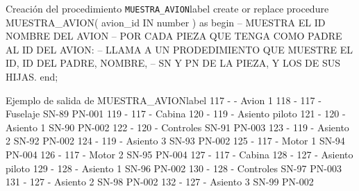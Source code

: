 \begin{homeworkProblem}
\begin{listadosql}{Creación del procedimiento \texttt{MUESTRA\_AVION}}{label}
create or replace procedure MUESTRA_AVION( avion_id IN number ) 
as
begin
  -- MUESTRA EL ID NOMBRE DEL AVION
  -- POR CADA PIEZA QUE TENGA COMO PADRE AL ID DEL AVION:
  --   LLAMA A UN PRODEDIMIENTO QUE MUESTRE EL ID, ID DEL PADRE, NOMBRE, 
  --   SN Y PN DE LA PIEZA, Y LOS DE SUS HIJAS.
end;
\end{listadosql}


\begin{listadotxt}{Ejemplo de salida de MUESTRA\_AVION}{label}
117 -  - Avion 1  
    118 - 117 - Fuselaje SN-89 PN-001
    119 - 117 - Cabina  
        120 - 119 - Asiento piloto  
            121 - 120 - Asiento 1 SN-90 PN-002
            122 - 120 - Controles SN-91 PN-003
        123 - 119 - Asiento 2 SN-92 PN-002
        124 - 119 - Asiento 3 SN-93 PN-002
    125 - 117 - Motor 1 SN-94 PN-004
    126 - 117 - Motor 2 SN-95 PN-004
    127 - 117 - Cabina  
        128 - 127 - Asiento piloto  
            129 - 128 - Asiento 1 SN-96 PN-002
            130 - 128 - Controles SN-97 PN-003
        131 - 127 - Asiento 2 SN-98 PN-002
        132 - 127 - Asiento 3 SN-99 PN-002

\end{listadotxt}
  
\end{homeworkProblem}

